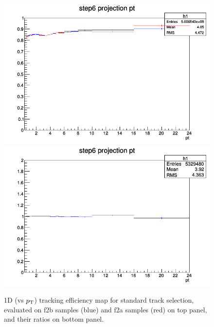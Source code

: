 \begin{figure}[h]
	\centering
	\includegraphics[scale=0.6]{figures/Effs/CompareEff_FiveSpecies.png}
    \includegraphics[scale=0.6]{figures/Effs/RatioEff_FiveSpecies.png}
	\caption{1D (vs $p_{\rm T}$) tracking efficiency map for standard track selection, evaluated on f2b samples (blue) and f2a samples (red) on top panel, and their ratios on bottom panel.}
	\label{fig:trackeff}	
\end{figure}

